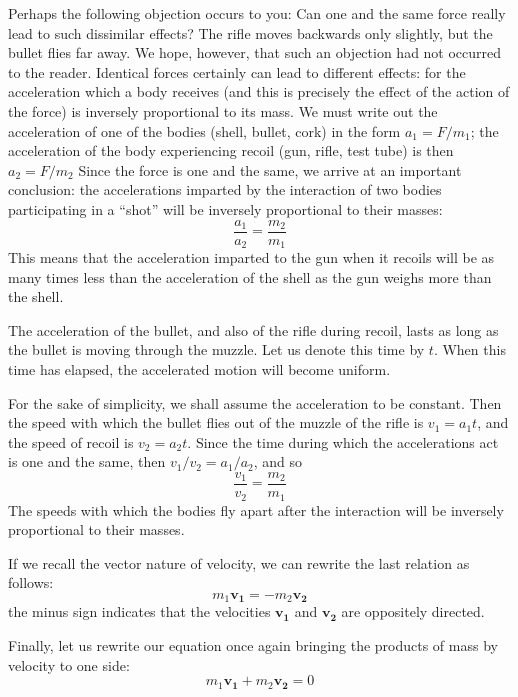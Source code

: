 Perhaps the following objection occurs to you: Can one
and the same force really lead to such dissimilar effects?
The rifle moves backwards only slightly, but the bullet
flies far away. We hope, however, that such an objection
had not occurred to the reader. Identical forces certainly
can lead to different effects: for the acceleration which
a body receives (and this is precisely the effect of the
action of the force) is inversely proportional to its mass.
We must write out the acceleration of one of the bodies
(shell, bullet, cork) in the form $a_{1} = F/m_{1}$; the acceleration of the body experiencing recoil (gun, rifle, test tube) is then $a_{2} = F/m_{2}$ Since the force is one and the same, we arrive at an important conclusion: the accelerations imparted by the interaction of two bodies participating in a ``shot'' will be inversely proportional to their masses:
\begin{equation*}%
\frac{a_{1}}{a_{2}} = \frac{m_{2}}{m_{1}}
\end{equation*}
This means that the acceleration imparted to the gun
when it recoils will be as many times less than the acceleration of the shell as the gun weighs more than the
shell.

The acceleration of the bullet, and also of the rifle
during recoil, lasts as long as the bullet is moving through
the muzzle. Let us denote this time by $t$. When this time
has elapsed, the accelerated motion will become uniform.

For the sake of simplicity, we shall assume the acceleration to be constant. Then the speed with which the bullet flies out of the muzzle of the rifle is $v_{1} = a_{1}t$, and the speed of recoil is $v_{2}= a_{2}t$. Since the time during which the accelerations act is one and the same, then $ v_{1}/v_{2} = a_{1}/a_{2}$, and so
\begin{equation*}%
\frac{v_{1}}{v_{2}} = \frac{m_{2}}{m_{1}}
\end{equation*}
The speeds with which the bodies fly apart after the interaction will be inversely proportional to their masses.

If we recall the vector nature of velocity, we can rewrite the last relation as follows:
\begin{equation*}%
m_{1}\mathbf{v_{1}} = - m_{2}\mathbf{v_{2}}
\end{equation*}
the minus sign indicates that the velocities $\mathbf{v_{1}}$ and $\mathbf{v_{2}}$ are oppositely directed.

Finally, let us rewrite our equation once again bringing the products of mass by velocity to one side:
\begin{equation*}%
m_{1}\mathbf{v_{1}} + m_{2}\mathbf{v_{2}} = 0
\end{equation*}


